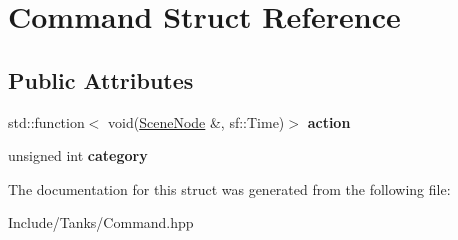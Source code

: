 \hypertarget{struct_command}{}\section{Command Struct Reference}
\label{struct_command}
\subsection*{Public Attributes}
\begin{DoxyCompactItemize}
\item 
\hypertarget{struct_command_a104fe6a9eb7bc8fc2f23acc67eb2b1d9}{}std\+::function$<$ void(\hyperlink{class_scene_node}{Scene\+Node} \&, sf\+::\+Time)$>$ {\bfseries action}\label{struct_command_a104fe6a9eb7bc8fc2f23acc67eb2b1d9}

\item 
\hypertarget{struct_command_a1529e898c9e6dd47b1826b5b1eac09fb}{}unsigned int {\bfseries category}\label{struct_command_a1529e898c9e6dd47b1826b5b1eac09fb}

\end{DoxyCompactItemize}


The documentation for this struct was generated from the following file\+:\begin{DoxyCompactItemize}
\item 
Include/\+Tanks/Command.\+hpp\end{DoxyCompactItemize}
